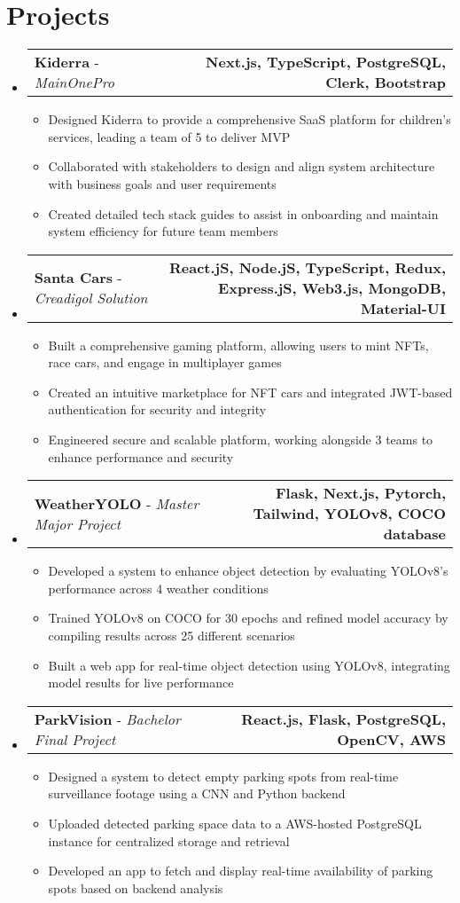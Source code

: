 \documentclass[letterpaper,11pt]{article}
\makeatletter
\newcommand{\resumeItem}[1]{
  \item\small{
    {#1 \vspace{-2pt}}
  }
}
\newcommand{\resumeProjectHeading}[2]{
    \item
    \begin{tabular*}{1.001\textwidth}{l@{\extracolsep{\fill}}r}
      \small#1 & \textbf{\small #2}\\
    \end{tabular*}\vspace{-7pt}
}
\newcommand{\resumeSubHeadingListStart}{\begin{itemize}[leftmargin=0.0in, label={}]}
\newcommand{\resumeSubHeadingListEnd}{\end{itemize}}
\newcommand{\resumeItemListStart}{\begin{itemize}}
\newcommand{\resumeItemListEnd}{\end{itemize}\vspace{-5pt}}
\makeatother
\begin{document}
\section{Projects}
\vspace{-6pt}
\resumeSubHeadingListStart
    \resumeProjectHeading
        {\textbf{Kiderra} - \emph{MainOnePro}}{Next.js, TypeScript, PostgreSQL, Clerk, Bootstrap}
        \resumeItemListStart
        \resumeItem{Designed Kiderra to provide a comprehensive SaaS platform for children's services, leading a team of 5 to deliver MVP}
        \resumeItem{Collaborated with stakeholders to design and align system architecture with business goals and user requirements}
        \resumeItem{Created detailed tech stack guides to assist in onboarding and maintain system efficiency for future team members}
        \resumeItemListEnd
        \vspace{-16pt}
    \resumeProjectHeading
        {\textbf{Santa Cars} - \emph{Creadigol Solution}}{React.jS, Node.jS, TypeScript, Redux, Express.jS, Web3.js, MongoDB, Material-UI}
        \resumeItemListStart
          \resumeItem{Built a comprehensive gaming platform, allowing users to mint NFTs, race cars, and engage in multiplayer games}
          \resumeItem{Created an intuitive marketplace for NFT cars and integrated JWT-based authentication for security and integrity}
          \resumeItem{Engineered secure and scalable platform, working alongside 3 teams to enhance performance and security}
        \resumeItemListEnd
        \vspace{-16pt}
    \resumeProjectHeading
        {\textbf{WeatherYOLO} - \emph{Master Major Project}}{Flask, Next.js, Pytorch, Tailwind, YOLOv8, COCO database}
        \resumeItemListStart
          \resumeItem{Developed a system to enhance object detection by evaluating YOLOv8’s performance across 4 weather conditions}
          \resumeItem{Trained YOLOv8 on COCO for 30 epochs and refined model accuracy by compiling results across 25 different scenarios}
          \resumeItem{Built a web app for real-time object detection using YOLOv8, integrating model results for live performance}
        \resumeItemListEnd
        \vspace{-16pt}
    \resumeProjectHeading
        {\textbf{ParkVision} - \emph{Bachelor Final Project}}{React.js, Flask, PostgreSQL, OpenCV, AWS}
        \resumeItemListStart
          \resumeItem{Designed a system to detect empty parking spots from real-time surveillance footage using a CNN and Python backend}
          \resumeItem{Uploaded detected parking space data to a AWS-hosted PostgreSQL instance for centralized storage and retrieval}
          \resumeItem{Developed an app to fetch and display real-time availability of parking spots based on backend analysis}
        \resumeItemListEnd
  \resumeSubHeadingListEnd
\vspace{-15pt}
\end{document}
